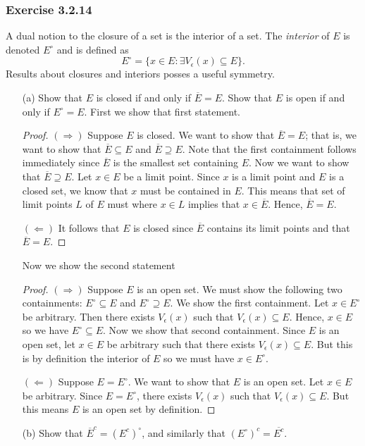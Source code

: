 \subsubsection{Exercise 3.2.14} A dual notion to the closure of a set is the interior of a set. The \textit{interior} of \( E \) is denoted \( E^{\circ} \) and is defined as 
\[ E^{\circ} = \{ x \in E: \exists V_{\epsilon}(x) \subseteq E  \}.  \]
Results about closures and interiors posses a useful symmetry. 
\begin{enumerate}
    \item[(a)] Show that \( E \) is closed if and only if \( \overline{E} = E  \). Show that \( E \) is open if and only if \( E^{\circ} = E  \).
        First we show that first statement.
        \begin{proof}
            \( (\Rightarrow) \) Suppose \( E \) is closed. We want to show that \( \overline{E} = E \); that is, we want to show that \( \overline{E} \subseteq E  \) and \( \overline{E} \supseteq E  \). Note that the first containment follows immediately since \( \overline{E} \) is the smallest set containing \( E \). 
            Now we want to show that \( \overline{E} \supseteq E \). Let \( x \in E \) be  a limit point. Since \( x \) is a limit point and \( E \) is a closed set, we know that \( x \) must be contained in \( E \). This means that set of limit points \( L \) of \( E \) must where \( x \in L \) implies that \( x \in \overline{E} \). Hence, \( \overline{E} = E \).

            \( (\Leftarrow) \) It follows that \( E \) is closed since \( \overline{E} \) contains its limit points and that \( \overline{E} = E \). 
        \end{proof}
        Now we show the second statement
        \begin{proof}
           \( (\Rightarrow) \) Suppose \( E \) is an open set. We must show the following two containments: 
            \( E^{\circ} \subseteq E  \) and \( E^{\circ} \supseteq E \). We show the first containment. Let \( x \in E^{\circ} \) be arbitrary. Then there exists \( V_{\epsilon }(x) \) such that \( V_{\epsilon } (x) \subseteq E \). Hence, \( x \in E  \) so we have \( E^{\circ} \subseteq E  \). Now we show that second containment. Since \( E \) is an open set, let \( x \in E \) be arbitrary such that there exists \( V_{\epsilon }(x) \subseteq E \). But this is by definition the interior of \( E \) so we must have \( x \in E^{\circ} \). 
           
            \( (\Leftarrow) \) Suppose \( E = E^{\circ} \). We want to show that \( E \) is an open set. Let \( x \in E  \) be arbitrary. Since \( E = E ^{\circ} \), there exists \( V_{\epsilon }(x) \) such that \( V_{\epsilon }(x) \subseteq E \). But this means \( E \) is an open set by definition.  
        \end{proof}
    \item[(b)] Show that \( \overline{E}^c = (E^c)^{\circ} \), and similarly that \( (E^{\circ})^c = \overline{E^c} \). 


\end{enumerate}
